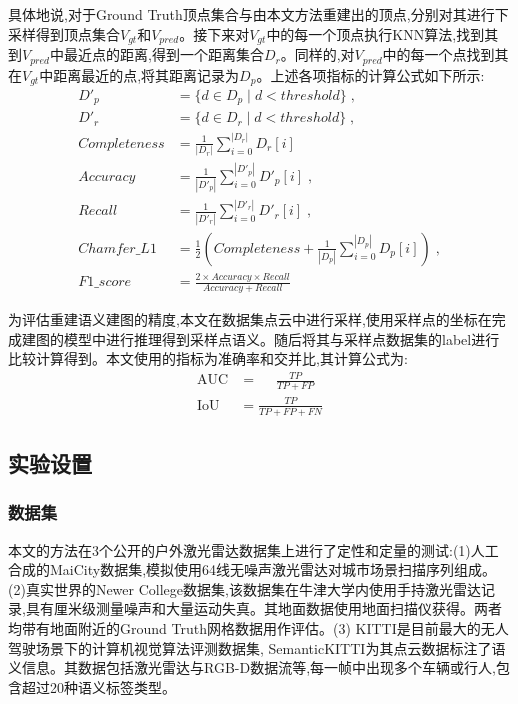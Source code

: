 具体地说,对于Ground Truth顶点集合与由本文方法重建出的顶点,分别对其进行下采样得到顶点集合$V_{gt}$和$V_{pred}$。接下来对$V_{gt}$中的每一个顶点执行KNN算法,找到其到$V_{pred}$中最近点的距离,得到一个距离集合$D_{r}$。同样的,对$V_{pred}$中的每一个点找到其在$V_{gt}$中距离最近的点,将其距离记录为$D_{p}$。上述各项指标的计算公式如下所示:
\begin{equation*}
\begin{alignedat}{2}
D'_{p} &= \{d \in D_{p} \mid d < threshold\}\;,\\
D'_{r} &= \{d \in D_r\mid d<threshold\}\;,\\
Completeness &= \frac{1}{|D_{r}|}\sum_{i=0}^{|D_{r}|}D_{r}[i]\;\\
Accuracy&= \frac{1}{|D'_{p}|}\sum_{i=0}^{|D'_{p}|}D'_{p}[i]\;,\\
Recall &=\frac{1}{|D'_{r}|}\sum_{i=0}^{|D'_{r}|}D'_{r}[i]\;,\\
Chamfer\_L1 &= \frac{1}{2}\left(Completeness + \frac{1}{|D_{p}|}\sum_{i=0}^{|D_{p}|}D_{p}[i]\right)\;,\\
F1\_score &= \frac{2\times Accuracy\times Recall}{Accuracy + Recall}
\end{alignedat}
\end{equation*}

为评估重建语义建图的精度,本文在数据集点云中进行采样,使用采样点的坐标在完成建图的模型中进行推理得到采样点语义。随后将其与采样点数据集的label进行比较计算得到。本文使用的指标为准确率和交并比,其计算公式为:
\begin{equation*}
    \begin{alignedat}{2}
    \mbox{AUC} &=\quad\;\frac{TP}{TP+FP}\\
    \mbox{IoU} &=\frac{TP}{TP + FP + FN}
    \end{alignedat}
\end{equation*}
\subsection{实验设置}
\subsubsection{数据集}
本文的方法在3个公开的户外激光雷达数据集上进行了定性和定量的测试:(1)人工合成的MaiCity数据集\cite{maicity},模拟使用64线无噪声激光雷达对城市场景扫描序列组成。(2)真实世界的Newer College数据集\cite{ncd},该数据集在牛津大学内使用手持激光雷达记录,具有厘米级测量噪声和大量运动失真。其地面数据使用地面扫描仪获得。两者均带有地面附近的Ground Truth网格数据用作评估。(3) KITTI\cite{KITTI}是目前最大的无人驾驶场景下的计算机视觉算法评测数据集, SemanticKITTI\cite{SemanticKITTI}为其点云数据标注了语义信息。其数据包括激光雷达与RGB-D数据流等,每一帧中出现多个车辆或行人,包含超过20种语义标签类型。
